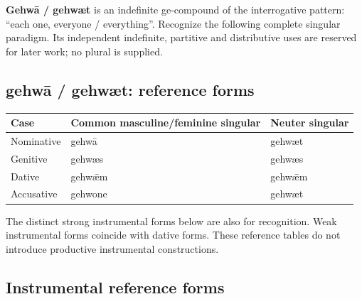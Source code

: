 \textbf{Gehwā /\allowbreak{} gehwæt} is an indefinite ge-compound of the interrogative pattern: “each one, everyone /\allowbreak{} everything”. Recognize the following complete singular paradigm. Its independent indefinite, partitive and distributive uses are reserved for later work; no plural is supplied.

\subsection*{gehwā /\allowbreak{} gehwæt: reference forms}

\par\begingroup
\fontsize{10.5}{13.2}\selectfont
\setlength{\LTleft}{0pt}\setlength{\LTright}{\fill}
\noindent
\begin{tabular}{@{}>{\raggedright\arraybackslash}p{25.54mm}>{\raggedright\arraybackslash}p{64.36mm}>{\raggedright\arraybackslash}p{28.48mm}@{}}
\toprule
\textbf{Case} & \textbf{Common masculine/\allowbreak{}feminine singular} & \textbf{Neuter singular} \\
\midrule
Nominative & gehwā & gehwæt \\
Genitive & gehwæs & gehwæs \\
Dative & gehwǣm & gehwǣm \\
Accusative & gehwone & gehwæt \\
\bottomrule
\end{tabular}
\par\endgroup

The distinct strong instrumental forms below are also for recognition. Weak instrumental forms coincide with dative forms. These reference tables do not introduce productive instrumental constructions.

\subsection*{Instrumental reference forms}

